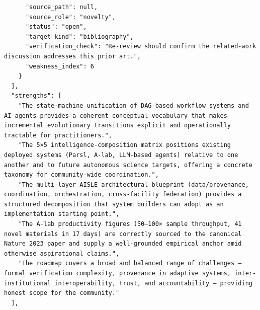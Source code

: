 \documentclass[11pt]{article}
\begin{document}
\begin{verbatim}
      "source_path": null,
      "source_role": "novelty",
      "status": "open",
      "target_kind": "bibliography",
      "verification_check": "Re-review should confirm the related-work discussion addresses this prior art.",
      "weakness_index": 6
    }
  ],
  "strengths": [
    "The state-machine unification of DAG-based workflow systems and AI agents provides a coherent conceptual vocabulary that makes incremental evolutionary transitions explicit and operationally tractable for practitioners.",
    "The 5×5 intelligence-composition matrix positions existing deployed systems (Parsl, A-lab, LLM-based agents) relative to one another and to future autonomous science targets, offering a concrete taxonomy for community-wide coordination.",
    "The multi-layer AISLE architectural blueprint (data/provenance, coordination, orchestration, cross-facility federation) provides a structured decomposition that system builders can adopt as an implementation starting point.",
    "The A-lab productivity figures (50–100× sample throughput, 41 novel materials in 17 days) are correctly sourced to the canonical Nature 2023 paper and supply a well-grounded empirical anchor amid otherwise aspirational claims.",
    "The roadmap covers a broad and balanced range of challenges — formal verification complexity, provenance in adaptive systems, inter-institutional interoperability, trust, and accountability — providing honest scope for the community."
  ],

\end{verbatim}
\end{document}
